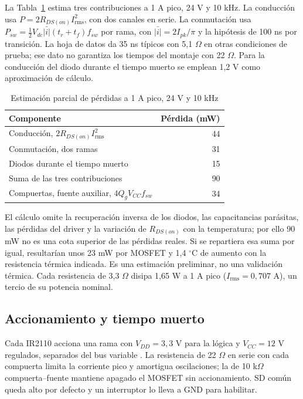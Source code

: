 \documentclass[conference]{IEEEtran}
\begin{document}
La Tabla~\ref{tab:perdidas} estima tres contribuciones a 1 A pico, 24 V y 10 kHz. La conducción usa $P=2R_{DS(on)}I_{\mathrm{rms}}^2$, con dos canales en serie. La conmutación usa $P_{sw}=\tfrac12V_{dc}\bar{|i|}(t_r+t_f)f_{sw}$ por rama, con $\bar{|i|}=2I_{pk}/\pi$ y la hipótesis de 100 ns por transición. La hoja de datos da 35 ns típicos con 5,1 $\Omega$ en otras condiciones de prueba; ese dato no garantiza los tiempos del montaje con 22 $\Omega$. Para la conducción del diodo durante el tiempo muerto se emplean 1,2 V como aproximación de cálculo.

\begin{table}[H]\caption{Estimación parcial de pérdidas a 1 A pico, 24 V y 10 kHz}\centering\small
\begin{tabular}{@{}lr@{}}\toprule
Componente & Pérdida (mW)\\\midrule
Conducción, $2R_{DS(on)}I_{\mathrm{rms}}^2$ & 44\\
Conmutación, dos ramas & 31\\
Diodos durante el tiempo muerto & 15\\
Suma de las tres contribuciones & 90\\
Compuertas, fuente auxiliar, $4Q_gV_{CC}f_{sw}$ & 34\\\bottomrule
\end{tabular}\label{tab:perdidas}\end{table}

El cálculo omite la recuperación inversa de los diodos, las capacitancias parásitas, las pérdidas del driver y la variación de $R_{DS(on)}$ con la temperatura; por ello 90 mW no es una cota superior de las pérdidas reales. Si se repartiera esa suma por igual, resultarían unos 23 mW por MOSFET y 1,4 $^\circ$C de aumento con la resistencia térmica indicada. Es una estimación preliminar, no una validación térmica. Cada resistencia de 3,3 $\Omega$ disipa 1,65 W a 1 A pico ($I_{\mathrm{rms}}=0{,}707$ A), un tercio de su potencia nominal.

\subsection{Accionamiento y tiempo muerto}
Cada IR2110 acciona una rama con $V_{DD}=3{,}3$ V para la lógica y $V_{CC}=12$ V regulados, separados del bus variable \cite{ir}. La resistencia de 22 $\Omega$ en serie con cada compuerta limita la corriente pico y amortigua oscilaciones; la de 10 k$\Omega$ compuerta--fuente mantiene apagado el MOSFET sin accionamiento. SD común queda alto por defecto y un interruptor lo lleva a GND para habilitar.
\end{document}
